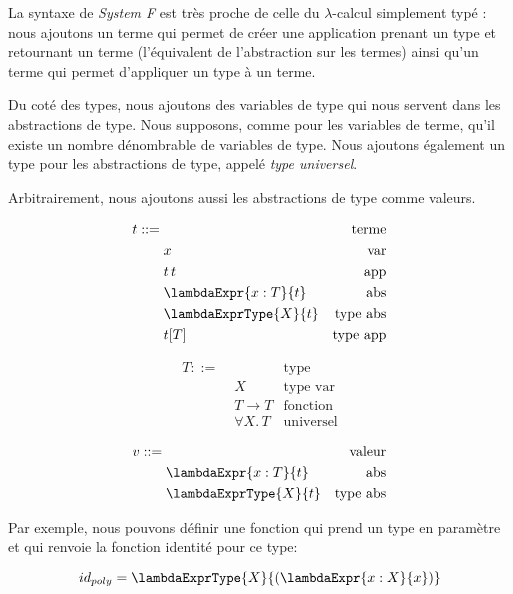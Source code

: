 La syntaxe de \textit{System F} est très proche de celle du $\lambda$-calcul
simplement typé : nous ajoutons un terme qui permet de créer une application
prenant un type et retournant un terme (l'équivalent de l'abstraction sur les
termes) ainsi qu'un terme qui permet d'appliquer un type à un terme.

Du coté des types, nous ajoutons des variables de type qui nous servent
dans les abstractions de type. Nous supposons, comme pour les variables de
terme, qu'il existe un nombre dénombrable de variables de type.
Nous ajoutons également un type pour les abstractions de type, appelé \textit{type universel}.

Arbitrairement, nous ajoutons aussi les abstractions de type comme valeurs.

\begin{minipage}{0.45\textwidth}
  \begin{align*}
    t ::= & \, & \text{terme} \\
          & \; x & \text{var} \\
          & \; t \, t & \text{app} \\
          & \; \lambdaExpr{x : T}{t} & \text{abs} \\
          & \; \lambdaExprType{X}{t} & \text{type abs} \\
          & \; t[T] & \text{type app}
  \end{align*}
\end{minipage}
\begin{minipage}{0.45\textwidth}
  \begin{align*}
    T ::= & \, & \text{type} \\
          & \; X & \text{type var} \\
          & \; T \rightarrow T & \text{fonction} \\
          & \; \forall X . \, T & \text{universel}
  \end{align*}
\end{minipage}
\begin{align*}
  v ::= & \, & \text{valeur} \\
        & \; \lambdaExpr{x : T}{t} & \text{abs} \\
        & \; \lambdaExprType{X}{t} & \text{type abs}
\end{align*}

Par exemple, nous pouvons définir une fonction qui prend un type en paramètre et
qui renvoie la fonction identité pour ce type:

\begin{equation*}
  id_{poly} = \lambdaExprType{X}{(\lambdaExpr{x : X}{x})}
\end{equation*}


